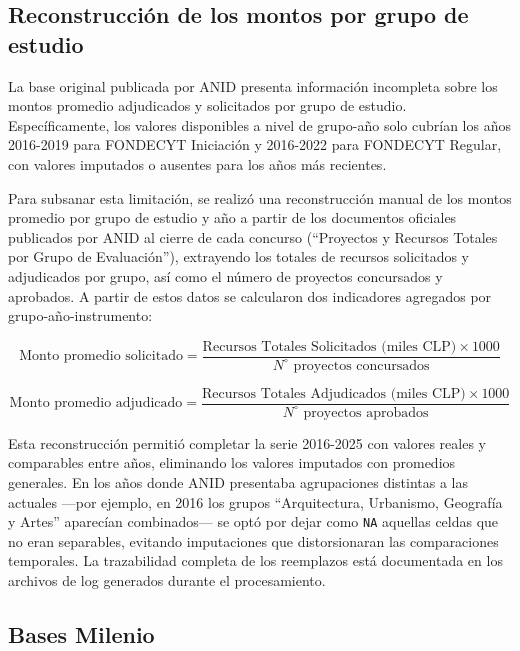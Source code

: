 \documentclass[
  spanish,
  a4paper,
  oneside]{scrbook}
\begin{document}
\subsection{Reconstrucción de los montos por grupo de
estudio}\label{reconstrucciuxf3n-de-los-montos-por-grupo-de-estudio}

La base original publicada por ANID presenta información incompleta
sobre los montos promedio adjudicados y solicitados por grupo de
estudio. Específicamente, los valores disponibles a nivel de grupo-año
solo cubrían los años 2016-2019 para FONDECYT Iniciación y 2016-2022
para FONDECYT Regular, con valores imputados o ausentes para los años
más recientes.

Para subsanar esta limitación, se realizó una reconstrucción manual de
los montos promedio por grupo de estudio y año a partir de los
documentos oficiales publicados por ANID al cierre de cada concurso
(``Proyectos y Recursos Totales por Grupo de Evaluación''), extrayendo
los totales de recursos solicitados y adjudicados por grupo, así como el
número de proyectos concursados y aprobados. A partir de estos datos se
calcularon dos indicadores agregados por grupo-año-instrumento:

\[\text{Monto promedio solicitado} = \frac{\text{Recursos Totales Solicitados (miles CLP)} \times 1000}{N^{\circ} \text{ proyectos concursados}}\]

\[\text{Monto promedio adjudicado} = \frac{\text{Recursos Totales Adjudicados (miles CLP)} \times 1000}{N^{\circ} \text{ proyectos aprobados}}\]

Esta reconstrucción permitió completar la serie 2016-2025 con valores
reales y comparables entre años, eliminando los valores imputados con
promedios generales. En los años donde ANID presentaba agrupaciones
distintas a las actuales ---por ejemplo, en 2016 los grupos
``Arquitectura, Urbanismo, Geografía y Artes'' aparecían combinados---
se optó por dejar como \texttt{NA} aquellas celdas que no eran
separables, evitando imputaciones que distorsionaran las comparaciones
temporales. La trazabilidad completa de los reemplazos está documentada
en los archivos de log generados durante el procesamiento.

\subsection{Bases Milenio}\label{bases-milenio}
\end{document}
